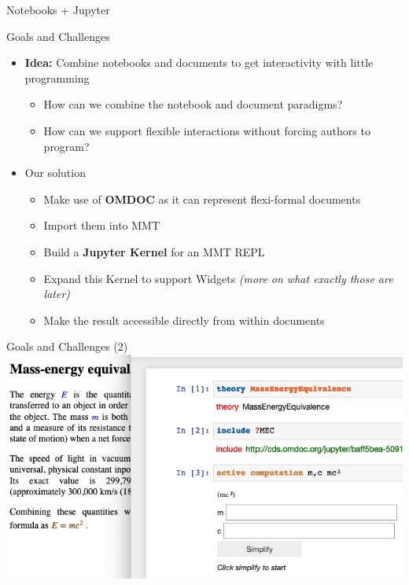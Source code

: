 \documentclass{beamer}
\begin{document}
\begin{frame}{Notebooks + Jupyter}
\begin{itemize}
        \end{itemize}
    \end{frame}

    \begin{frame}{Goals and Challenges}
        \begin{itemize}
            \item \textbf{Idea:} Combine notebooks and documents to get interactivity with little programming
            \begin{itemize}
                \item How can we combine the notebook and document paradigms?
                \item How can we support flexible interactions without forcing authors to program?
            \end{itemize}

            \item Our solution
            \begin{itemize}
                \item Make use of \textbf{OMDOC} as it can represent flexi-formal documents
                \item Import them into MMT
                \item Build a \textbf{Jupyter Kernel} for an MMT REPL
                \item Expand this Kernel to support Widgets \textit{(more on what exactly those are later)}
                \item Make the result accessible directly from within documents
            \end{itemize}
        \end{itemize}
    \end{frame}

    \begin{frame}[fragile]{Goals and Challenges (2) }
        \includegraphics[scale=0.5]{images/acwidget}
    \end{frame}
    
\end{document}
